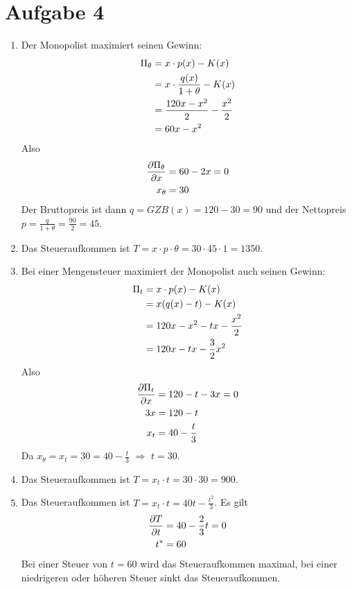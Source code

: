\documentclass{article}
\begin{document}
	\section*{Aufgabe 4}
	\begin{enumerate}[label=(\alph*)]
		\item Der Monopolist maximiert seinen Gewinn:
		\begin{align}
			\Pi_\theta &= x\cdot p(x) - K(x) \notag \\
			&= x\cdot \frac{q(x)}{1+\theta} - K(x) \notag \\
			&= \frac{120x-x^2}{2} - \frac{x^2}{2} \notag \\
			&= 60x - x^2 \notag
		\end{align}
		Also
		\begin{align}
			\frac{\partial\Pi_\theta}{\partial x} &= 60-2x = 0 \notag \\
			x_\theta &= 30 \notag
		\end{align}
		Der Bruttopreis ist dann $q=GZB(x)=120-30=90$ und der Nettopreis $p=\frac{q}{1+\theta}=\frac{90}{2}=45$.
		\item Das Steueraufkommen ist $T=x\cdot p\cdot\theta=30\cdot 45\cdot 1 = 1350$.
		\item Bei einer Mengensteuer maximiert der Monopolist auch seinen Gewinn:
		\begin{align}
			\Pi_t &= x\cdot p(x) - K(x) \notag \\
			&= x(q(x) - t) - K(x) \notag \\
			&= 120x-x^2-tx - \frac{x^2}{2} \notag \\
			&= 120x-tx - \frac{3}{2}x^2 \notag
		\end{align}
		Also
		\begin{align}
			\frac{\partial\Pi_t}{\partial x} &= 120-t-3x = 0 \notag \\
			3x &= 120-t \notag \\
			x_t &= 40-\frac{t}{3} \notag
		\end{align}
		Da $x_\theta=x_t=30=40-\frac{t}{3}$ $\Rightarrow$ $t=30$.
		\item Das Steueraufkommen ist $T=x_t\cdot t = 30\cdot 30=900$.
		\item Das Steueraufkommen ist $T=x_t\cdot t=40t-\frac{t^2}{3}$. Es gilt
		\begin{align}
			\frac{\partial T}{\partial t} &= 40-\frac{2}{3}t =0 \notag \\
			t^\ast &= 60 \notag
		\end{align}
		Bei einer Steuer von $t=60$ wird das Steueraufkommen maximal, bei einer niedrigeren oder höheren Steuer sinkt das Steueraufkommen.
	\end{enumerate}
\end{document}

